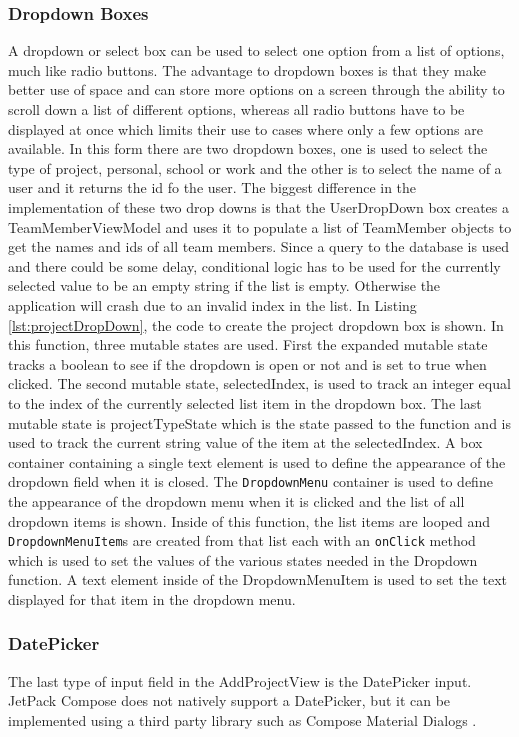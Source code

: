\documentclass[12pt]{article}
\begin{document}
\subsubsection{Dropdown Boxes}
A dropdown or select box can be used to select one option from a list of options, much like radio buttons. The advantage to dropdown boxes is that they make better use of space and can store more options on a screen through the ability to scroll down a list of different options, whereas  all radio buttons have to be displayed at once which limits their use to cases where only a few options are available. In this form there are two dropdown boxes, one is used to select the type of project, personal, school or work and the other is to select the name of a user and it returns the id fo the user. The biggest difference in the implementation of these two drop downs is that the UserDropDown box creates a TeamMemberViewModel and uses it to populate a list of TeamMember objects to get the names and ids of all team members. Since a query to the database is used and there could be some delay, conditional logic has to be used for the currently selected value to be an empty string if  the list is empty. Otherwise the application will crash due to an invalid index in the list. In Listing \ref{lst:projectDropDown}, the code to create the project dropdown box is shown. In this function, three mutable states are used. First the expanded mutable state tracks a boolean to see if the dropdown is open or not and is set to true when clicked. The second mutable state, selectedIndex, is used to track an integer equal to the index of the currently selected list item in the dropdown box. The last mutable state is projectTypeState which is the state passed to the function and is used to track the current string value of the item at the selectedIndex. A box container containing a single text element is used to define the appearance of the dropdown field when it is closed. The \verb|DropdownMenu| container is used to define the appearance of the dropdown menu when it is clicked and the list of all dropdown items is shown. Inside of this function, the list items are looped and \verb|DropdownMenuItem|s are created from that list each with an \verb|onClick| method which is used to set the values of the various states needed in the Dropdown function. A text element inside of the DropdownMenuItem is used to set the text displayed for that item in the dropdown menu. 

\subsubsection{DatePicker}
The last type of input field in the AddProjectView is the DatePicker input. JetPack Compose does not natively support a DatePicker, but it can be implemented using a third party library such as Compose Material Dialogs \cite{GitHubComposeMaterialDialogs}.  
\end{document}
